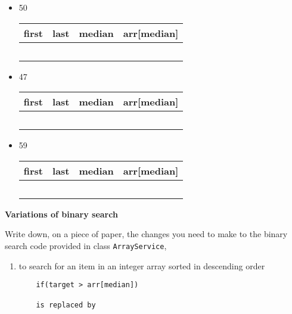 \begin{questions}
\begin{itemize}
\item 50

\begin{tabular}{c | c | c | c}
\hline
first &	last &	median &	arr[median]\\
\hline
& & & \\
\hline
& & & \\
\hline
& & & \\
\hline
& & & \\
\hline
& & & \\
\end{tabular}
\vskip 0.5cm

\item 47

\begin{tabular}{c | c | c | c}
\hline
first &	last &	median &	arr[median]\\
\hline
& & & \\
\hline
& & & \\
\hline
& & & \\
\hline
& & & \\
\hline
& & & \\
\end{tabular}
\vskip 0.5cm

\item 59

\begin{tabular}{c | c | c | c}
\hline
first &	last &	median &	arr[median]\\
\hline
& & & \\
\hline
& & & \\
\hline
& & & \\
\hline
& & & \\
\hline
& & & \\
\end{tabular}
\end{itemize}

\newpage
\question \textbf{Variations of binary search} \vskip 0.5cm

Write down, on a piece of paper, the changes you need to make to the binary search code provided in class \texttt{ArrayService},

\begin{enumerate}
\item to search for an item in an integer array sorted in descending order
\begin{solution}
\begin{verbatim}
	if(target > arr[median])
	
	is replaced by 
	

\end{verbatim}
\end{solution}
\end{enumerate}
\end{questions}

